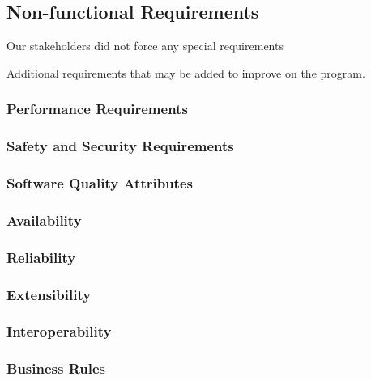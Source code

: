 \subsection{Non-functional Requirements}
Our stakeholders did not force any special requirements

Additional requirements that may be added to improve on the program.
\subsubsection{Performance Requirements}
\subsubsection{Safety and Security Requirements}
\subsubsection{Software Quality Attributes}
\subsubsection{Availability}
\subsubsection{Reliability}
\subsubsection{Extensibility}
\subsubsection{Interoperability}
\subsubsection{Business Rules}